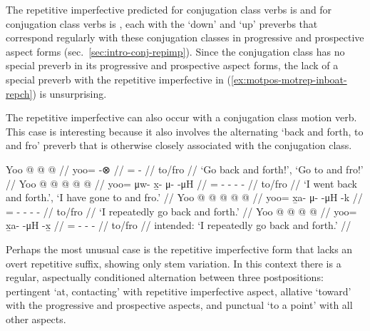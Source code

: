 \documentclass[12pt,letterpaper,oneside,article]{memoir}
\begin{document}
The repetitive imperfective predicted for  conjugation class verbs is  and for  conjugation class verbs is , each with the  ‘down’ and  ‘up’ preverbs that correspond regularly with these conjugation classes in progressive and prospective aspect forms (sec.\ \ref{sec:intro-conj-repimp}).
Since the  conjugation class has no special preverb in its progressive and prospective aspect forms, the lack of a special preverb with the repetitive imperfective in (\ref{ex:motpos-motrep-inboat-repch}) is unsurprising.

The  repetitive imperfective can also occur with a  conjugation class motion verb.
This case is interesting because it also involves the alternating  ‘back and forth, to and fro’ preverb that is otherwise closely associated with the  conjugation class.

\pex\label{ex:motpos-motrep-alt}%
\a\label{ex:motpos-motrep-alt-imp}%
%
\begingl
	\gla	Yoo @  @ {} @ {} //
	\glb	yoo= {}  -⊗ //
	\glc	{}= \·  - //
	\gld	to/fro\·  {} {} //
	\glft	‘Go back and forth!’, ‘Go to and fro!’
		//
\endgl
\a\label{ex:motpos-motrep-alt-pfv}%
%
\begingl
	\gla	Yoo @  @ {} @ {} @ {} @ {} //
	\glb	yoo= μw- x̱- μ-  -μH //
	\glc	{}= - - -  - //
	\gld	to/fro\·  {} {} {} {} //
	\glft	‘I went back and forth.’, ‘I have gone to and fro.’
		//
\endgl
\a\label{ex:motpos-motrep-alt-repch}%
%
\begingl
	\gla	Yoo @  @ {} @ {} @ {} @ {} //
	\glb	yoo= x̱a- μ-  -μH -k //
	\glc	{}= - -  - - //
	\gld	to/fro\·  {} {} {} //
	\glft	‘I repeatedly go back and forth.’
		//
\endgl
\a\label{ex:motpos-motrep-alt-repxh}%
\ljudge{*}%
%
\begingl
	\gla	Yoo @  @ {} @ {} @ {} //
	\glb	yoo= x̱a-  -μH -x̱ //
	\glc	{}= -  - - //
	\gld	to/fro\·  {} {} {} //
	\glft	intended: ‘I repeatedly go back and forth.’
		//
\endgl
\xe

Perhaps the most unusual case is the repetitive imperfective form that lacks an overt repetitive suffix, showing only  stem variation.
In this context there is a regular, aspectually conditioned alternation between three postpositions: pertingent  ‘at, contacting’ with repetitive imperfective aspect, allative  ‘toward’ with the progressive and prospective aspects, and punctual  ‘to a point’ with all other aspects.
\end{document}
